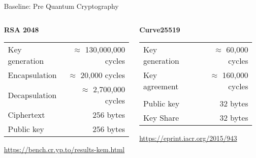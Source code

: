 \documentclass[xcolor=table,10pt,aspectratio=169]{beamer}
\begin{document}
\begin{frame}[label={sec:org95c8c25}]{Baseline: Pre Quantum Cryptography}
\begin{columns}[t]
\begin{column}{0.5\columnwidth}
\textbf{RSA 2048}

\begin{center}
\begin{tabular}{lr}
Key generation & \(\approx\) 130,000,000 cycles\\
Encapsulation & \(\approx\) 20,000 cycles\\
Decapsulation & \(\approx\) 2,700,000 cycles\\
Ciphertext & 256 bytes\\
Public key & 256 bytes\\
\end{tabular}

\end{center}

\small \url{https://bench.cr.yp.to/results-kem.html}
\end{column}

\begin{column}{0.5\columnwidth}
\textbf{Curve25519}

\begin{center}
\begin{tabular}{lr}
Key generation & \(\approx\) 60,000 cycles\\
Key agreement & \(\approx\) 160,000 cycles\\
 & \\
Public key & 32 bytes\\
Key Share & 32 bytes\\
\end{tabular}

\end{center}

\small \url{https://eprint.iacr.org/2015/943}
\end{column}
\end{columns}
\end{frame}
\end{document}

